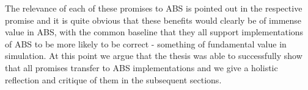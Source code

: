 The relevance of each of these promises to ABS is pointed out in the respective promise and it is quite obvious that these benefits would clearly be of immense value in ABS, with the common baseline that they all support implementations of ABS to be more likely to be correct - something of fundamental value in simulation. At this point we argue that the thesis was able to successfully show that all promises transfer to ABS implementations and we give a holistic reflection and critique of them in the subsequent sections.









